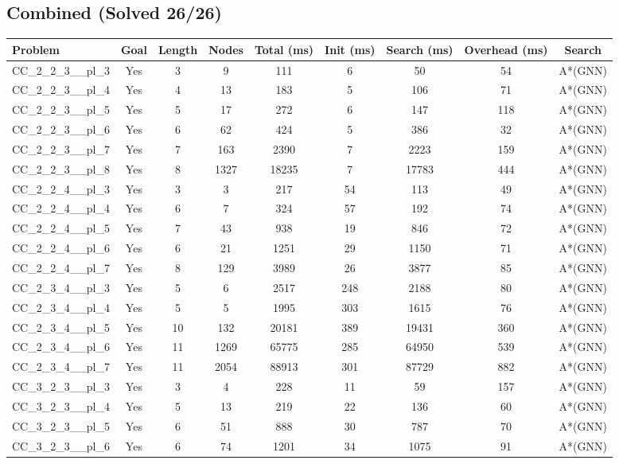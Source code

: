 \documentclass{article}
\begin{document}
\subsection*{Combined (Solved 26/26)}
\begin{tabular}{lcccccccc}
\toprule
Problem & Goal & Length & Nodes & Total (ms) & Init (ms) & Search (ms) & Overhead (ms) & Search \\
\midrule
CC\_2\_2\_3\_\_pl\_3 & Yes & 3 & 9 & 111 & 6 & 50 & 54 & A*(GNN) \\
CC\_2\_2\_3\_\_pl\_4 & Yes & 4 & 13 & 183 & 5 & 106 & 71 & A*(GNN) \\
CC\_2\_2\_3\_\_pl\_5 & Yes & 5 & 17 & 272 & 6 & 147 & 118 & A*(GNN) \\
CC\_2\_2\_3\_\_pl\_6 & Yes & 6 & 62 & 424 & 5 & 386 & 32 & A*(GNN) \\
CC\_2\_2\_3\_\_pl\_7 & Yes & 7 & 163 & 2390 & 7 & 2223 & 159 & A*(GNN) \\
CC\_2\_2\_3\_\_pl\_8 & Yes & 8 & 1327 & 18235 & 7 & 17783 & 444 & A*(GNN) \\
CC\_2\_2\_4\_\_pl\_3 & Yes & 3 & 3 & 217 & 54 & 113 & 49 & A*(GNN) \\
CC\_2\_2\_4\_\_pl\_4 & Yes & 6 & 7 & 324 & 57 & 192 & 74 & A*(GNN) \\
CC\_2\_2\_4\_\_pl\_5 & Yes & 7 & 43 & 938 & 19 & 846 & 72 & A*(GNN) \\
CC\_2\_2\_4\_\_pl\_6 & Yes & 6 & 21 & 1251 & 29 & 1150 & 71 & A*(GNN) \\
CC\_2\_2\_4\_\_pl\_7 & Yes & 8 & 129 & 3989 & 26 & 3877 & 85 & A*(GNN) \\
CC\_2\_3\_4\_\_pl\_3 & Yes & 5 & 6 & 2517 & 248 & 2188 & 80 & A*(GNN) \\
CC\_2\_3\_4\_\_pl\_4 & Yes & 5 & 5 & 1995 & 303 & 1615 & 76 & A*(GNN) \\
CC\_2\_3\_4\_\_pl\_5 & Yes & 10 & 132 & 20181 & 389 & 19431 & 360 & A*(GNN) \\
CC\_2\_3\_4\_\_pl\_6 & Yes & 11 & 1269 & 65775 & 285 & 64950 & 539 & A*(GNN) \\
CC\_2\_3\_4\_\_pl\_7 & Yes & 11 & 2054 & 88913 & 301 & 87729 & 882 & A*(GNN) \\
CC\_3\_2\_3\_\_pl\_3 & Yes & 3 & 4 & 228 & 11 & 59 & 157 & A*(GNN) \\
CC\_3\_2\_3\_\_pl\_4 & Yes & 5 & 13 & 219 & 22 & 136 & 60 & A*(GNN) \\
CC\_3\_2\_3\_\_pl\_5 & Yes & 6 & 51 & 888 & 30 & 787 & 70 & A*(GNN) \\
CC\_3\_2\_3\_\_pl\_6 & Yes & 6 & 74 & 1201 & 34 & 1075 & 91 & A*(GNN) \\

\end{tabular}
\end{document}

